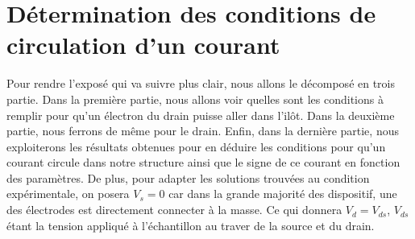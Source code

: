 %
%




\section{Détermination des conditions de circulation d'un courant}
Pour rendre l'exposé qui va suivre plus clair, nous allons le décomposé en trois partie. Dans la première partie, nous allons voir quelles sont les conditions à remplir pour qu'un électron du drain puisse aller dans l'il\^ot. Dans la deuxième partie, nous ferrons de m\^eme pour le drain. Enfin, dans la dernière partie, nous exploiterons les résultats obtenues pour en déduire les conditions pour qu'un courant circule dans notre structure ainsi que le signe de ce courant en fonction des paramètres. De plus, pour adapter les solutions trouvées au condition expérimentale, on posera $V_s = 0$ car dans la grande majorité des dispositif, une des électrodes est directement connecter à la masse. Ce qui donnera $V_d=V_{ds}$, $V_{ds}$ étant la tension appliqué à l'échantillon au traver de la source et du drain.

